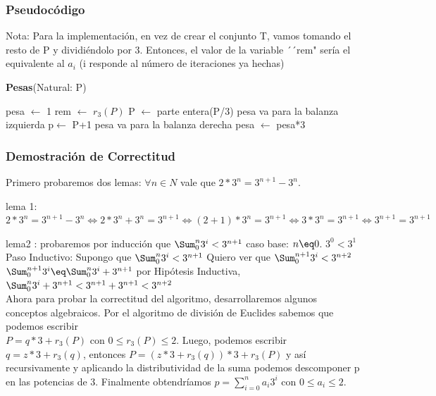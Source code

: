 \documentclass[spanish,12pt]{article}
\begin{document}
\subsubsection{Pseudocódigo}

Nota: Para la implementación, en vez de crear el conjunto T, vamos tomando el resto de P y dividiéndolo por 3. Entonces, el valor de la variable ´´rem" sería el equivalente al $a_i$ (i responde al número de iteraciones ya hechas)

\begin{algorithm}[H]{\textbf{Pesas}(Natural: P)}
	\begin{algorithmic}[1]
		\State pesa $\gets$ 1
		 	\State rem $\gets$ $r_3 (P)$
	    		\State P $\gets $ parte entera(P/3)
	    			\State pesa va para la balanza izquierda    			\Else
	    				\State p$\gets$ P+1
	    				\State pesa va para la balanza derecha
				\EndIf
			\EndIf
			\State pesa $\gets$ pesa*3
		\EndWhile
	\end{algorithmic}
\end{algorithm}



\subsubsection{Demostración de Correctitud}

Primero probaremos dos lemas:
$\forall n \in N$ vale que  $2*3^{n} = 3^{n+1}-3^{n}$.

lema 1:$ 2*3^{n} = 3^{n+1}-3^{n} \Longleftrightarrow 2*3^{n}+3^{n} = 3^{n+1} \Longleftrightarrow (2+1)*3^{n} = 3^{n+1} \Longleftrightarrow   3*3^{n} = 3^{n+1} \Longleftrightarrow  3^{n+1} = 3^{n+1}$

lema2 : probaremos por inducción que $ \Sum_{0}^{n}{3^{i}} < 3^{n+1}$
caso base: $n \eq 0$. $3^{0} < 3^{1}$
Paso Inductivo:
	Supongo que $ \Sum_{0}^{n}{3^{i}} < 3^{n+1}$
	Quiero ver que $ \Sum_{0}^{n+1}{3^{i}} < 3^{n+2}$
	$ \Sum_{0}^{n+1}{3^{i}} \eq \Sum_{0}^{n}{3^{i}} + 3^{n+1}$
	por Hipótesis Inductiva, $\Sum_{0}^{n}{3^{i}} + 3^{n+1} < 3^{n+1} + 3^{n+1} < 3^{n+2} $
\\
Ahora para probar la correctitud del algoritmo, desarrollaremos algunos conceptos algebraicos.
Por el algoritmo de división de Euclides sabemos que podemos escribir \\  $P= q*3+ r_{3}(P)$ con $0\leq r_{3}(P) \leq 2 $. Luego, podemos escribir $q= z*3 + r_{3}(q)$, entonces $P= (z*3 + r_{3}(q))*3 +r_{3}(P)$ y así recursivamente y aplicando la distributividad de la suma podemos descomponer p en las potencias de 3. Finalmente obtendríamos $p= \sum_{i=0}^{n}{a_i 3^{i}} $ con $0 \leq a_i \leq 2$.
\end{document}
